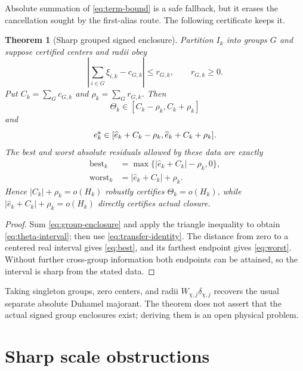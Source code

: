 \documentclass[11pt]{article}
\newtheorem{theorem}{Theorem}[section]
\theoremstyle{remark}
\newcommand{\wh}[1]{\widehat{#1}}
\begin{document}
Absolute summation of \eqref{eq:term-bound} is a safe fallback, but it erases
the cancellation sought by the first-alias route.  The following certificate
keeps it.

\begin{theorem}[Sharp grouped signed enclosure]
\label{thm:grouped}
Partition $I_k$ into groups $G$ and suppose certified centers and radii obey
\begin{equation}
 \left|\sum_{i\in G}\xi_{i,k}-c_{G,k}\right|\le r_{G,k},
 \qquad r_{G,k}\ge0.
 \label{eq:group-enclosure}
\end{equation}
Put $C_k=\sum_Gc_{G,k}$ and $\rho_k=\sum_Gr_{G,k}$.  Then
\begin{equation}
 \Theta_k\in[C_k-\rho_k,C_k+\rho_k]
 \label{eq:theta-interval}
\end{equation}
and
\begin{equation}
 e_k^{\rm a}\in
 [\wh e_k+C_k-\rho_k,\wh e_k+C_k+\rho_k].
 \label{eq:residual-interval}
\end{equation}
The best and worst absolute residuals allowed by these data are exactly
\begin{align}
 \operatorname{best}_k
 &=\max\{|\wh e_k+C_k|-\rho_k,0\},
 \label{eq:best}\\
 \operatorname{worst}_k
 &=|\wh e_k+C_k|+\rho_k.
 \label{eq:worst}
\end{align}
Hence $|C_k|+\rho_k=o(H_k)$ robustly certifies $\Theta_k=o(H_k)$, while
$|\wh e_k+C_k|+\rho_k=o(H_k)$ directly certifies actual closure.
\end{theorem}

\begin{proof}
Sum \eqref{eq:group-enclosure} and apply the triangle inequality to obtain
\eqref{eq:theta-interval}; then use \eqref{eq:transfer-identity}.  The
distance from zero to a centered real interval gives \eqref{eq:best}, and
its farthest endpoint gives \eqref{eq:worst}.  Without further cross-group
information both endpoints can be attained, so the interval is sharp from
the stated data.
\end{proof}

Taking singleton groups, zero centers, and radii
$W_{\chi,j}\delta_{\chi,j}$ recovers the usual separate absolute Duhamel
majorant.  The theorem does not assert that the actual signed group
enclosures exist; deriving them is an open physical problem.

\section{Sharp scale obstructions}
\end{document}
